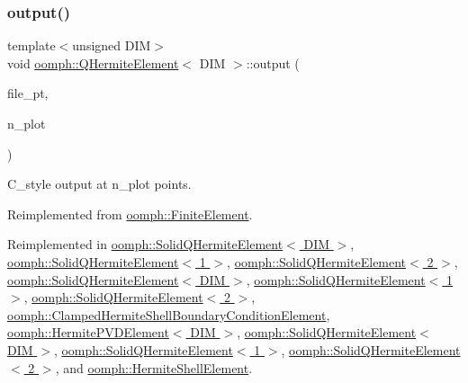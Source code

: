 \subsubsection{\texorpdfstring{output()}{output()}\hspace{0.1cm}{\footnotesize\ttfamily [8/12]}}
{\footnotesize\ttfamily template$<$unsigned D\+IM$>$ \\
void \hyperlink{classoomph_1_1QHermiteElement}{oomph\+::\+Q\+Hermite\+Element}$<$ D\+IM $>$\+::output (\begin{DoxyParamCaption}\item[{F\+I\+LE $\ast$}]{file\+\_\+pt,  }\item[{const unsigned \&}]{n\+\_\+plot }\end{DoxyParamCaption})\hspace{0.3cm}{\ttfamily [virtual]}}



C\+\_\+style output at n\+\_\+plot points. 



Reimplemented from \hyperlink{classoomph_1_1FiniteElement_adfaee690bb0608f03320eeb9d110d48c}{oomph\+::\+Finite\+Element}.



Reimplemented in \hyperlink{classoomph_1_1SolidQHermiteElement_aabd23592071d29249154d7cde20f2d88}{oomph\+::\+Solid\+Q\+Hermite\+Element$<$ D\+I\+M $>$}, \hyperlink{classoomph_1_1SolidQHermiteElement_aabd23592071d29249154d7cde20f2d88}{oomph\+::\+Solid\+Q\+Hermite\+Element$<$ 1 $>$}, \hyperlink{classoomph_1_1SolidQHermiteElement_aabd23592071d29249154d7cde20f2d88}{oomph\+::\+Solid\+Q\+Hermite\+Element$<$ 2 $>$}, \hyperlink{classoomph_1_1SolidQHermiteElement_adb8a603a0f50a7944be7af4a1cd0abc5}{oomph\+::\+Solid\+Q\+Hermite\+Element$<$ D\+I\+M $>$}, \hyperlink{classoomph_1_1SolidQHermiteElement_adb8a603a0f50a7944be7af4a1cd0abc5}{oomph\+::\+Solid\+Q\+Hermite\+Element$<$ 1 $>$}, \hyperlink{classoomph_1_1SolidQHermiteElement_adb8a603a0f50a7944be7af4a1cd0abc5}{oomph\+::\+Solid\+Q\+Hermite\+Element$<$ 2 $>$}, \hyperlink{classoomph_1_1ClampedHermiteShellBoundaryConditionElement_ade7c773aa9f4587d25945b4f4860a690}{oomph\+::\+Clamped\+Hermite\+Shell\+Boundary\+Condition\+Element}, \hyperlink{classoomph_1_1HermitePVDElement_a4a8edf00d8c8b4fe61676fead8413ab9}{oomph\+::\+Hermite\+P\+V\+D\+Element$<$ D\+I\+M $>$}, \hyperlink{classoomph_1_1SolidQHermiteElement_a29b211e63df67028435a71ac732d47ad}{oomph\+::\+Solid\+Q\+Hermite\+Element$<$ D\+I\+M $>$}, \hyperlink{classoomph_1_1SolidQHermiteElement_a29b211e63df67028435a71ac732d47ad}{oomph\+::\+Solid\+Q\+Hermite\+Element$<$ 1 $>$}, \hyperlink{classoomph_1_1SolidQHermiteElement_a29b211e63df67028435a71ac732d47ad}{oomph\+::\+Solid\+Q\+Hermite\+Element$<$ 2 $>$}, and \hyperlink{classoomph_1_1HermiteShellElement_a805a6e65b4dbb7bcffab6180ff9686ba}{oomph\+::\+Hermite\+Shell\+Element}.

